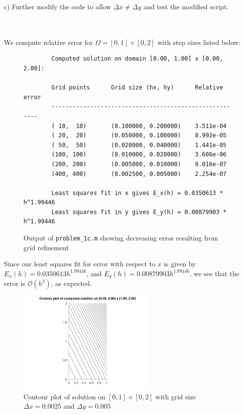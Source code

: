 \pagebreak
c) Further modify the code to allow $\Delta x \neq \Delta y$ and test the modified script.

\begin{solution}\ \\\\
    We compute relative error for $\Omega = [0, 1] \times [0, 2]$ with step sizes listed below:

    \begin{figure}[h]
        \begin{lstlisting}
        Computed solution on domain [0.00, 1.00] x [0.00, 2.00]: 
 
        Grid points      Grid size (hx, hy)      Relative error
        -------------------------------------------------------
        ( 10,  10)       (0.100000, 0.200000)    3.511e-04 
        ( 20,  20)       (0.050000, 0.100000)    8.992e-05 
        ( 50,  50)       (0.020000, 0.040000)    1.441e-05 
        (100, 100)       (0.010000, 0.020000)    3.606e-06 
        (200, 200)       (0.005000, 0.010000)    9.016e-07 
        (400, 400)       (0.002500, 0.005000)    2.254e-07 
             
        Least squares fit in x gives E_x(h) = 0.0350613 * h^1.99446
        Least squares fit in y gives E_y(h) = 0.00879903 * h^1.99446
        \end{lstlisting}
        \caption{Output of \texttt{problem\_1c.m} showing decreasing error resulting from grid refinement}
    \end{figure}

    Since our least squares fit for error with respect to $x$ is given by $E_x(h) = 0.0350613 h^{1.99446}$, and 
    $E_y(h) = 0.00879903 h^{1.99446}$, we see that the error is $\mathcal{O}(h^2)$, as expected.
    
    \begin{figure}[h]
        \centering
        \includegraphics[width=0.6\textwidth]{poisson_5pt_stencil_0-0_1-2_hx-0.003_hy-0.005.png}
        \caption{Contour plot of solution on $[0, 1] \times [0, 2]$ with grid size $\Delta x = 0.0025$ and $\Delta y = 0.005$}
    \end{figure}
\end{solution}